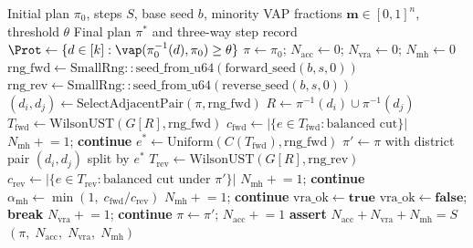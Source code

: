 \begin{algorithm}
\caption{\vr{} Chain}
\label{alg:vr}
\begin{algorithmic}[1]
\Require Initial plan $\pi_0$, steps $S$, base seed $b$, minority VAP
         fractions $\mathbf{m} \in [0,1]^n$, threshold $\theta$
\Ensure  Final plan $\pi^*$ and three-way step record
\State $\Prot \gets \{d \in [k] : \vap(\pi_0^{-1}(d), \pi_0) \geq \theta\}$
\State $\pi \gets \pi_0$; \quad
       $N_{\mathrm{acc}} \gets 0$; \quad
       $N_{\mathrm{vra}} \gets 0$; \quad
       $N_{\mathrm{mh}} \gets 0$
  \State $\mathrm{rng\_fwd} \gets \mathrm{SmallRng::seed\_from\_u64}(\mathrm{forward\_seed}(b, s, 0))$
  \State $\mathrm{rng\_rev} \gets \mathrm{SmallRng::seed\_from\_u64}(\mathrm{reverse\_seed}(b, s, 0))$
  \State {}
  \State $(d_i, d_j) \gets \mathrm{SelectAdjacentPair}(\pi, \mathrm{rng\_fwd})$
  \State $R \gets \pi^{-1}(d_i) \cup \pi^{-1}(d_j)$
  \State $T_{\mathrm{fwd}} \gets \mathrm{WilsonUST}(G[R], \mathrm{rng\_fwd})$
  \State $c_{\mathrm{fwd}} \gets |\{e \in T_{\mathrm{fwd}} : \text{balanced cut}\}|$
   $N_{\mathrm{mh}} \mathrel{+}= 1$; \textbf{continue} \EndIf
  \State $e^* \gets \mathrm{Uniform}(C(T_{\mathrm{fwd}}), \mathrm{rng\_fwd})$
  \State $\pi' \gets \pi$ with district pair $(d_i, d_j)$ split by $e^*$
  \State $T_{\mathrm{rev}} \gets \mathrm{WilsonUST}(G[R], \mathrm{rng\_rev})$
  \State $c_{\mathrm{rev}} \gets |\{e \in T_{\mathrm{rev}} : \text{balanced cut under } \pi'\}|$
   $N_{\mathrm{mh}} \mathrel{+}= 1$; \textbf{continue} \EndIf
  \State $\alpha_{\mathrm{mh}} \gets \min(1,\; c_{\mathrm{fwd}} / c_{\mathrm{rev}})$
  \If{$\mathrm{Uniform}([0,1)) \geq \alpha_{\mathrm{mh}}$}
    \State $N_{\mathrm{mh}} \mathrel{+}= 1$; \textbf{continue}
  \EndIf
  \State {}
  \State $\mathrm{vra\_ok} \gets \mathbf{true}$
      \State $\mathrm{vra\_ok} \gets \mathbf{false}$; \textbf{break}
    \EndIf
  \EndFor
    \State $N_{\mathrm{vra}} \mathrel{+}= 1$; \textbf{continue}
  \EndIf
  \State $\pi \gets \pi'$; \quad $N_{\mathrm{acc}} \mathrel{+}= 1$
\EndFor
\State \textbf{assert} $N_{\mathrm{acc}} + N_{\mathrm{vra}} + N_{\mathrm{mh}} = S$
\State \Return $(\pi,\; N_{\mathrm{acc}},\; N_{\mathrm{vra}},\; N_{\mathrm{mh}})$
\end{algorithmic}
\end{algorithm}

